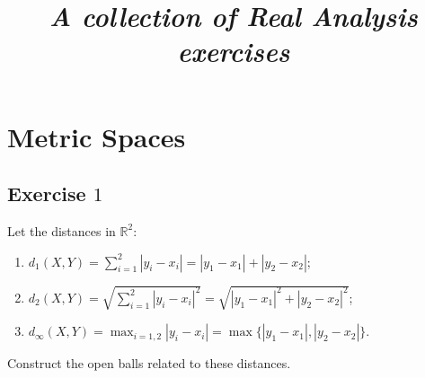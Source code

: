 \documentclass[a4paper, twoside, openany]{book}
\title{\textbf{\huge{\textit{A collection of Real Analysis exercises}}}}
\begin{document}
\maketitle
\chapter{Metric Spaces}
\section*{Exercise $1$}
Let the  distances in $\mathbb{R}^2$:
\begin{enumerate}
\item $d_1(X, Y) = \sum_{i=1}^2 |y_i - x_i| = |y_1 - x_1| + |y_2 - x_2|$;
\item $d_2(X, Y) = \sqrt{\sum_{i=1}^2 |y_i -x_i|^2} = \sqrt{|y_1 - x_1|^2 + |y_2 - x_2|^2}$;
\item $d_{\infty}(X, Y) = \max_{i=1,2} |y_i - x_i| = \max \{ |y_1 - x_1|, |y_2 - x_2| \}$. 
\end{enumerate}
Construct the open balls related to these distances.
\end{document}
